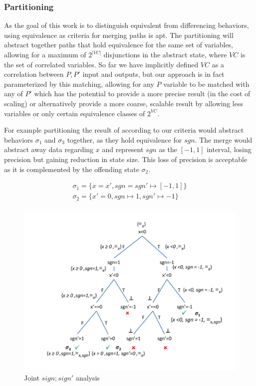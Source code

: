 \subsubsection{Partitioning}
As the goal of this work is to distinguish equivalent from differencing behaviors, using equivalence as criteria for merging paths is apt. The partitioning will abstract together paths that hold equivalence for the same set of variables, allowing for a maximum of $2^{|VC|}$ disjunctions in the abstract state, where $VC$ is the set of correlated variables. So far we have implicitly defined $VC$ as a correlation between $P,P'$ input and outputs, but our approach is in fact parameterized by this matching, allowing for any $P$ variable to be matched with any of $P'$ which has the potential to provide a more precise result (in the cost of scaling) or alternatively provide a more coarse, scalable result by allowing less variables or only certain equivalence classes of $2^{VC}$.

For example partitioning the result of  according to our criteria would abstract behaviors $\sigma_1$ and $\sigma_3$ together, as they hold equivalence for $sgn$. The merge would abstract away data regarding $x$ and represent $sgn$ as the $[-1,1]$ interval, losing precision but gaining reduction in state size. This loss of precision is acceptable as it is complemented by the offending state $\sigma_2$.

{\footnotesize
\[
\begin{array}{c}
\sigma_1 = \{x = x', sgn = sgn' \mapsto [-1,1]\}\\
\sigma_2 = \{x' = 0, sgn \mapsto 1, sgn' \mapsto -1\}\\
\end{array}
\]
}

\begin{figure}[H]
\centering
\includegraphics[scale=0.38,clip=true,trim = 75pt 25pt 5pt 20pt]{figures/sign-graph-joint}
\caption{Joint $sign;sign'$ analysis}
\end{figure}

